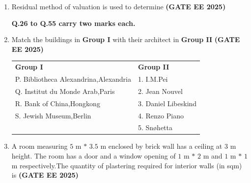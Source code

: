 \documentclass[journal,12pt,onecolumn]{IEEEtran}
\theoremstyle{remark}
\begin{document}
{\begin{enumerate}
\begin{enumerate}
\end{enumerate}
\item Residual method of valuation is used to determine \hfill \textbf{(GATE EE 2025)}
\begin{enumerate}
\end{enumerate}
\textbf{Q.26 to Q.55 carry two marks each.}
\item Match the buildings in \textbf{Group I} with their architect in \textbf{Group II} \hfill \textbf{(GATE EE 2025)}
\\
\begin{tabular}{p{}p{}}
 \textbf{Group I}    & \textbf{Group II} \\
P. Bibliotheca Alexandrina,Alexandria     & 1. I.M.Pei\\
Q. Institut du Monde Arab,Paris & 2. Jean Nouvel\\
R. Bank of China,Hongkong & 3. Daniel Libeskind\\
S. Jewish Museum,Berlin & 4. Renzo Piano\\
  & 5. Sn\o hetta
\end{tabular}
\begin{enumerate}
\end{enumerate}
\item A room measuring $5$ m $*$ $3.5$ m enclosed by brick wall has a ceiling at $3$ m height. The room has a door and a window opening of $1$ m $*$ $2$ m and $1$ m $*$ $1$ m respectively.The quantity of plastering required for interior walls (in sqm) is \hfill \textbf{(GATE EE 2025)}

\end{enumerate}}
\end{document}
